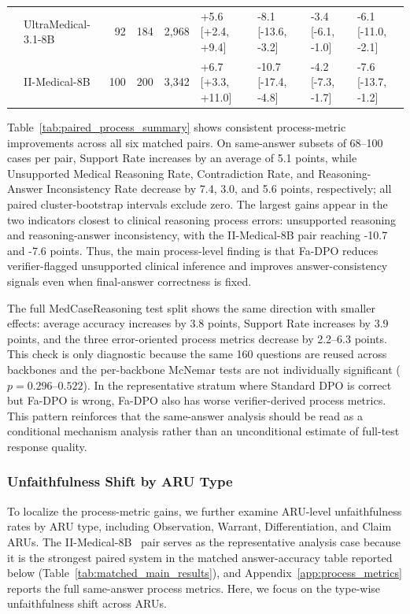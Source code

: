 \documentclass[a4paper,fleqn,doubleblind]{cas-sc}
\begin{document}
\begin{table}[htbp]
\begin{adjustbox}{max width=\textwidth}
\begin{tabular}{llrrrllll}
    \midrule
     & UltraMedical-3.1-8B & 92 & 184 & 2,968 & +5.6 [+2.4, +9.4] & -8.1 [-13.6, -3.2] & -3.4 [-6.1, -1.0] & -6.1 [-11.0, -2.1] \\
     & II-Medical-8B & 100 & 200 & 3,342 & +6.7 [+3.3, +11.0] & -10.7 [-17.4, -4.8] & -4.2 [-7.3, -1.7] & -7.6 [-13.7, -1.2] \\
    \bottomrule
    \end{tabular}
    \end{adjustbox}
\end{table}

Table~\ref{tab:paired_process_summary} shows consistent process-metric improvements across all six matched pairs. On same-answer subsets of 68--100 cases per pair, Support Rate increases by an average of 5.1 points, while Unsupported Medical Reasoning Rate, Contradiction Rate, and Reasoning-Answer Inconsistency Rate decrease by 7.4, 3.0, and 5.6 points, respectively; all paired cluster-bootstrap intervals exclude zero. The largest gains appear in the two indicators closest to clinical reasoning process errors: unsupported reasoning and reasoning-answer inconsistency, with the II-Medical-8B pair reaching -10.7 and -7.6 points. Thus, the main process-level finding is that Fa-DPO reduces verifier-flagged unsupported clinical inference and improves answer-consistency signals even when final-answer correctness is fixed.

The full MedCaseReasoning test split shows the same direction with smaller effects: average accuracy increases by 3.8 points, Support Rate increases by 3.9 points, and the three error-oriented process metrics decrease by 2.2--6.3 points. This check is only diagnostic because the same 160 questions are reused across backbones and the per-backbone McNemar tests are not individually significant ($p=0.296$--$0.522$). In the representative stratum where Standard DPO is correct but Fa-DPO is wrong, Fa-DPO also has worse verifier-derived process metrics. This pattern reinforces that the same-answer analysis should be read as a conditional mechanism analysis rather than an unconditional estimate of full-test response quality.

\subsubsection{Unfaithfulness Shift by ARU Type}
\label{subsec:aru_shift}

To localize the process-metric gains, we further examine ARU-level unfaithfulness rates by ARU type, including Observation, Warrant, Differentiation, and Claim ARUs. The II-Medical-8B~\cite{intelligentinternet2025iimedical8b} pair serves as the representative analysis case because it is the strongest paired system in the matched answer-accuracy table reported below (Table~\ref{tab:matched_main_results}), and Appendix~\ref{app:process_metrics} reports the full same-answer process metrics. Here, we focus on the type-wise unfaithfulness shift across ARUs.
\end{document}
